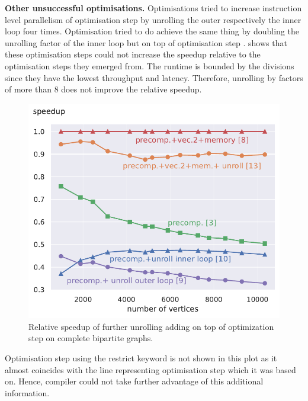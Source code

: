\documentclass[letterpaper]{article}
\newcommand{\mypar}[1]{{\bf #1.}}
\begin{document}
\mypar{Other unsuccessful optimisations} Optimisations  tried to increase instruction level parallelism of optimisation step  by unrolling the outer respectively the inner loop four times.
Optimisation  tried to do achieve the same thing by doubling the unrolling factor of the inner loop but on top of optimisation step .
 shows that these optimisation steps could not increase the speedup relative to the optimisation steps they emerged from.
The runtime is bounded by the divisions since they have the lowest throughput and latency.\sr{*}
Therefore, unrolling by factors of more than 8 does not improve the relative speedup.
\begin{figure}\centering
	\includegraphics[scale=0.58]{img/speedup[3][8][9][10][13]_small.pdf}
	\caption{Relative speedup of further unrolling adding on top of optimization step  on complete bipartite graphs. \label{speedupUnsuccessful}}
\end{figure}
Optimisation step  using the restrict keyword is not shown in this plot as it almost coincides with the line representing optimisation step  which it was based on.
Hence, compiler could not take further advantage of this additional information.
\end{document}
